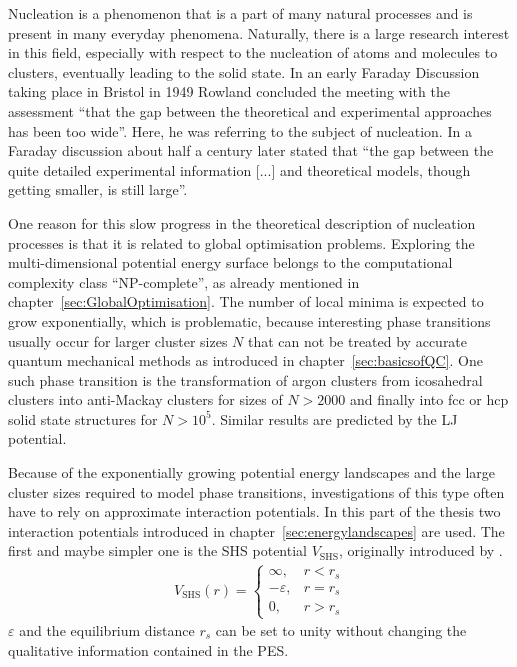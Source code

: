 Nucleation is a phenomenon that is a part of many natural processes and is
present in many everyday phenomena. Naturally, there is a large research
interest in this field, especially with respect to the nucleation of atoms and
molecules to clusters, eventually leading to the solid
state.\autocite{Stillinger_Packingstructurestransitions_1984,
Martin-1996,Wales-1996, Vlieg_atomicscaleunderstandingcrystal_2007, Arkus-2010,
Woodley-2010, Karthika-2016, Holmes-Cerfon_StickySphereClusters_2017} In an
early Faraday Discussion taking place in Bristol in 1949 Rowland concluded the
meeting with the assessment ``that the gap between the theoretical and
experimental approaches has been too wide''.\autocite{Rowland-1949} Here, he was
referring to the subject of nucleation. In a Faraday discussion about half a
century later \citeauthor{Vlieg_atomicscaleunderstandingcrystal_2007} stated
that ``the gap between the quite detailed experimental information [...] and
theoretical models, though getting smaller, is still
large''.\autocite{Vlieg_atomicscaleunderstandingcrystal_2007}

One reason for this slow progress in the theoretical description of nucleation
processes is that it is related to global optimisation problems. Exploring the
multi-dimensional potential energy surface belongs to the computational
complexity class ``NP-complete'', as already mentioned in
chapter~\ref{sec:GlobalOptimisation}. The number of local minima is expected to
grow exponentially,\autocite{Stillinger_Packingstructurestransitions_1984,
Oganov-2006, Massen_Powerlawdistributionsareas_2007, wales10, Oganov-2011,
calvo12, Wales-2015} which is problematic, because interesting phase transitions
usually occur for larger cluster sizes $N$ that can not be treated by accurate
quantum mechanical methods as introduced in chapter~\ref{sec:basicsofQC}. One
such phase transition is the transformation of argon clusters from icosahedral
clusters into anti-Mackay clusters for sizes of $N>2000$ and finally into
\acf{fcc} or \acf{hcp} solid state structures for
$N>10^5$.\autocite{Krainyukova-2012} Similar results are predicted by the
\acf{LJ} potential.\autocite{Martin-1996,
Schwerdtfeger_ExtensionLennardJonespotential_2006, Krainyukova-2007}

Because of the exponentially growing potential energy landscapes and the large
cluster sizes required to model phase transitions, investigations of this type
often have to rely on approximate interaction potentials. In this part of the
thesis two interaction potentials introduced in
chapter~\ref{sec:energylandscapes} are used. The first and maybe simpler one is
the \acf{SHS} potential $V_\mathrm{SHS}$, originally introduced by
\citeauthor{baxter68}\autocite{baxter68}.
%
\begin{align}
    V_\mathrm{SHS}(r)=\begin{cases}
        \infty, & r < r_s\\
        -\varepsilon, & r = r_s\\
        0, & r > r_s
    \end{cases}
\label{eqn:KS}
\end{align}
%
$\varepsilon$ and the equilibrium distance $r_s$ can be set to unity without
changing the qualitative information contained in the \ac{PES}. 

